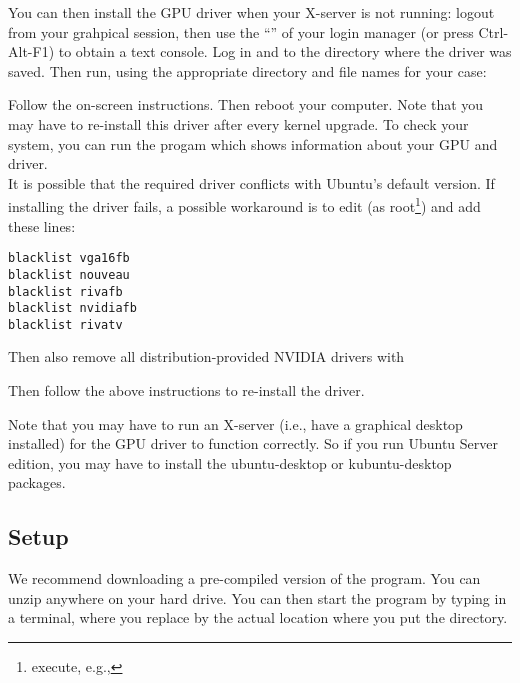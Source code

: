 You can then install the GPU driver when your X-server is not running: logout from your grahpical session, then use the ``'' of your login manager (or press Ctrl-Alt-F1) to obtain a text console. Log in and  to the directory where the driver was saved. Then run, using the appropriate directory and file names for your case:


Follow the on-screen instructions. Then reboot your computer. Note that you may have to re-install this driver after every kernel upgrade. To check your system, you can run the progam  which shows information about your GPU and driver.\\

It is possible that the required driver conflicts with Ubuntu's default version. If installing the driver fails, a possible workaround is to edit  (as root\footnote{execute, e.g., }) and add these lines:
\small
\begin{verbatim}
blacklist vga16fb
blacklist nouveau
blacklist rivafb
blacklist nvidiafb
blacklist rivatv
\end{verbatim}
\normalsize

Then also remove all distribution-provided \textsc{NVIDIA} drivers with


Then follow the above instructions to re-install the driver.

Note that you may have to run an X-server (i.e., have a graphical desktop installed) for the GPU driver to function correctly. So if you run Ubuntu Server edition, you may have to install the ubuntu-desktop or kubuntu-desktop packages.

\subsection{Setup}

We recommend downloading a pre-compiled version of the program. You can unzip  anywhere on your hard drive. You can then start the program by typing  in a terminal, where you replace  by the actual location where you put the \prog directory.

